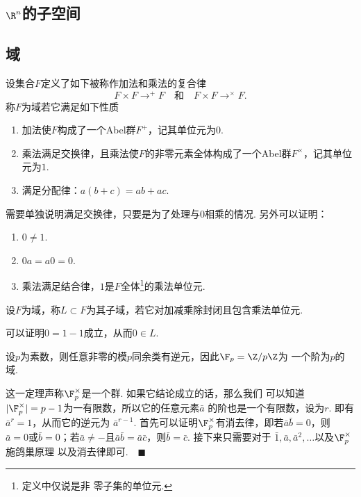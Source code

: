 \subsection{$\R^n$的子空间}

\subsection{域}

  \begin{defi}[域]
    设集合$F$定义了如下被称作加法和乘法的复合律
    \[
      F\times F\to^{+} F \quad\text{和}\quad F\times F\to^{\times}F.
    \]
    称$F$为域若它满足如下性质
    \begin{enumerate}
      \item 加法使$F$构成了一个Abel群$F^+$，记其单位元为$0$.
      \item 乘法满足交换律，且乘法使$F$的非零元素全体构成了一个Abel群$F^\times$，记其单位元为$1$.
      \item 满足分配律：$a(b+c)=ab+ac$.
    \end{enumerate}
  \end{defi}
  \remark
    [2.]需要单独说明满足交换律，只要是为了处理与$0$相乘的情况. 另外可以证明：
    \begin{enumerate}
      \item $0\ne 1$.
      \item $0a=a0=0$.
      \item 乘法满足结合律，$1$是$F$全体\footnote{定义中仅说是非
      零子集的单位元.}的乘法单位元.
    \end{enumerate}

  \begin{defi}[子域]
    设$F$为域，称$L\subset F$为其子域，若它对加减乘除封闭且包含乘法单位元.
  \end{defi}
  \remark
    可以证明$0=1-1$成立，从而$0\in L$.

  \begin{thm}
    设$p$为素数，则任意非零的模$p$同余类有逆元，因此$\F_p=\Z/p\Z$为
    一个阶为$p$的域.
  \end{thm}
  \remark
    这一定理声称$\F_p^\times$是一个群. 如果它结论成立的话，那么我们
    可以知道$|\F_p^\times|=p-1$为一有限数，所以它的任意元素$\bar{a}$
    的阶也是一个有限数，设为$r$. 即有$\bar{a}^r=1$，从而它的逆元为
    $\bar{a}^{r-1}$.
  \proof
    首先可以证明$\F_p^\times$有消去律，即若$\bar{a}\bar{b}=0$，则
    $\bar{a}=0$或$\bar{b}=0$；若$\bar{a}\ne -$且$\bar{a}\bar{b}
    =\bar{a}\bar{c}$，则$\bar{b}=\bar{c}$. 接下来只需要对于
    $\bar{1},\bar{a},\bar{a}^2,\dots$以及$\F_p^\times$施鸽巢原理
    以及消去律即可.$\quad\blacksquare$


